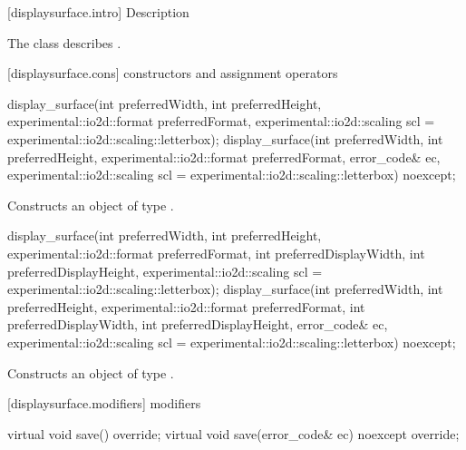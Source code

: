  [displaysurface.intro] { Description}

\pnum
{}
The class  describes .

 [displaysurface.cons] { constructors and assignment operators}

\begin{itemdecl}
display_surface(int preferredWidth, int preferredHeight, 
  experimental::io2d::format preferredFormat,
  experimental::io2d::scaling scl = experimental::io2d::scaling::letterbox);
display_surface(int preferredWidth, int preferredHeight, 
  experimental::io2d::format preferredFormat, error_code& ec,
  experimental::io2d::scaling scl = experimental::io2d::scaling::letterbox)
  noexcept;
\end{itemdecl}
\begin{itemdescr}
	\pnum
	\effects
	Constructs an object of type .
	
	\pnum
	\postconditions
\end{itemdescr}

\begin{itemdecl}
display_surface(int preferredWidth, int preferredHeight, 
  experimental::io2d::format preferredFormat,
  int preferredDisplayWidth, int preferredDisplayHeight,
  experimental::io2d::scaling scl = experimental::io2d::scaling::letterbox);
display_surface(int preferredWidth, int preferredHeight, 
  experimental::io2d::format preferredFormat,
  int preferredDisplayWidth, int preferredDisplayHeight, error_code& ec,
  experimental::io2d::scaling scl = experimental::io2d::scaling::letterbox) 
  noexcept;
\end{itemdecl}
\begin{itemdescr}
	\pnum
	\effects
	Constructs an object of type .
	
	\pnum
	\postconditions
\end{itemdescr}

 [displaysurface.modifiers]{ modifiers}

\begin{itemdecl}
    virtual void save() override;
    virtual void save(error_code& ec) noexcept override;
\end{itemdecl}
\begin{itemdescr}
	\pnum
	\effects
	
	\pnum
	\postconditions
	
\end{itemdescr}

